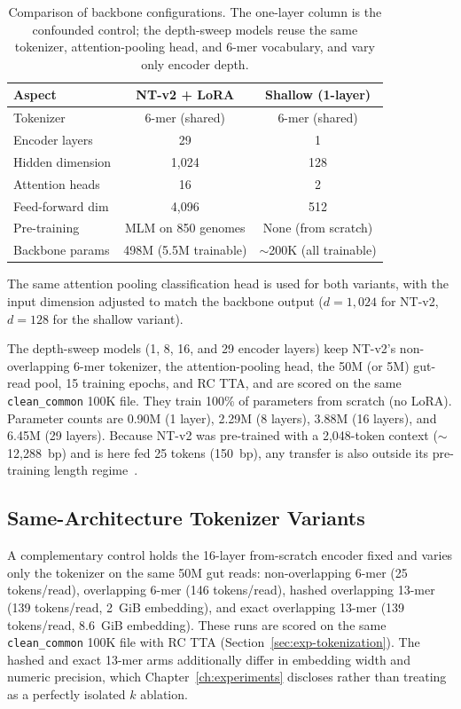 \begin{table}[htbp]
    \centering
    \caption{Comparison of backbone configurations. The one-layer column is the confounded control; the depth-sweep models reuse the same tokenizer, attention-pooling head, and 6-mer vocabulary, and vary only encoder depth.}
    \label{tab:backbone-comparison}
    \begin{tabular}{lcc}
        \toprule
        \textbf{Aspect} & \textbf{NT-v2 + LoRA} & \textbf{Shallow (1-layer)} \\
        \midrule
        Tokenizer & 6-mer (shared) & 6-mer (shared) \\
        Encoder layers & 29 & 1 \\
        Hidden dimension & 1,024 & 128 \\
        Attention heads & 16 & 2 \\
        Feed-forward dim & 4,096 & 512 \\
        Pre-training & MLM on 850 genomes & None (from scratch) \\
        Backbone params & 498M (5.5M trainable) & $\sim$200K (all trainable) \\
        \bottomrule
    \end{tabular}
\end{table}

The same attention pooling classification head is used for both variants, with the input dimension adjusted to match the backbone output ($d = 1{,}024$ for NT-v2, $d = 128$ for the shallow variant).

The depth-sweep models (1, 8, 16, and 29 encoder layers) keep NT-v2's non-overlapping 6-mer tokenizer, the attention-pooling head, the 50M (or 5M) gut-read pool, 15 training epochs, and RC TTA, and are scored on the same \texttt{clean\_common} 100K file. They train 100\% of parameters from scratch (no LoRA). Parameter counts are 0.90M (1 layer), 2.29M (8 layers), 3.88M (16 layers), and 6.45M (29 layers). Because NT-v2 was pre-trained with a 2{,}048-token context (${\sim}$12{,}288~bp) and is here fed 25 tokens (150~bp), any transfer is also outside its pre-training length regime~\cite{DallaTorre2023}.

\subsection{Same-Architecture Tokenizer Variants}
\label{sec:method-samearch-tok}

A complementary control holds the 16-layer from-scratch encoder fixed and varies only the tokenizer on the same 50M gut reads: non-overlapping 6-mer (25 tokens/read), overlapping 6-mer (146 tokens/read), hashed overlapping 13-mer (139 tokens/read, 2~GiB embedding), and exact overlapping 13-mer (139 tokens/read, 8.6~GiB embedding). These runs are scored on the same \texttt{clean\_common} 100K file with RC TTA (Section~\ref{sec:exp-tokenization}). The hashed and exact 13-mer arms additionally differ in embedding width and numeric precision, which Chapter~\ref{ch:experiments} discloses rather than treating as a perfectly isolated $k$ ablation.

